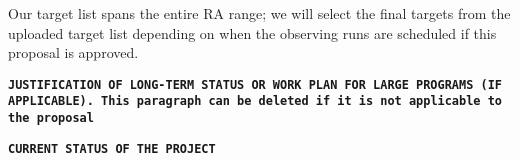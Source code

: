 \documentclass[12pt]{article}
\begin{document}
Our target list spans the entire RA range; we will select the final targets from the uploaded target list depending on when the observing runs are scheduled if this proposal is approved.

\clearpage
\texttt{\textbf{JUSTIFICATION OF LONG-TERM STATUS OR WORK PLAN FOR LARGE PROGRAMS (IF APPLICABLE). \textbf{This paragraph can be deleted if it is not applicable to the proposal}} \\ }

\clearpage
\texttt{\textbf{CURRENT STATUS OF THE PROJECT} \\ }

\end{document}
